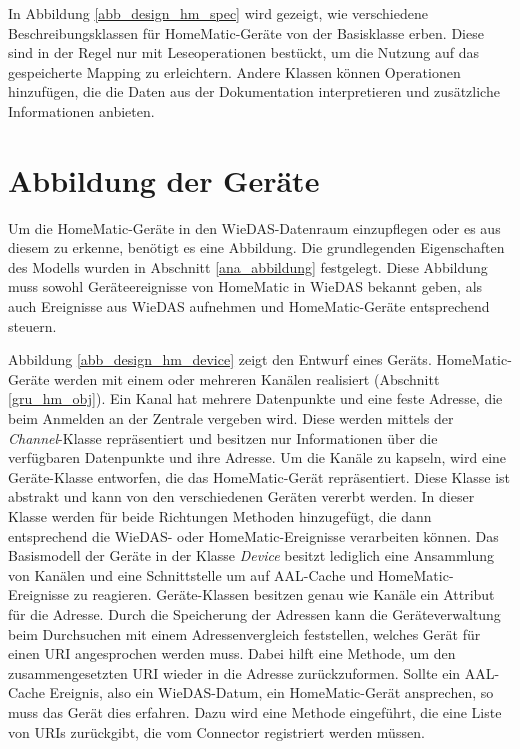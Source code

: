 \vfill
\pagebreak


In Abbildung \ref{abb_design_hm_spec} wird gezeigt, wie verschiedene Beschreibungsklassen
für HomeMatic-Geräte von der Basisklasse erben.
Diese sind in der Regel nur mit Leseoperationen bestückt, um die Nutzung auf das gespeicherte
Mapping zu erleichtern.
Andere Klassen können Operationen hinzufügen, die die Daten aus der Dokumentation \cite{homematic_xmlrpc}
interpretieren und zusätzliche Informationen anbieten.


\section{Abbildung der Geräte}
\label{des_abbildung}

Um die HomeMatic-Geräte in den WieDAS-Datenraum einzupflegen oder es aus diesem zu erkenne,
benötigt es eine Abbildung.
Die grundlegenden Eigenschaften des Modells wurden in Abschnitt \ref{ana_abbildung}
festgelegt.
Diese Abbildung muss sowohl Geräteereignisse von HomeMatic in WieDAS bekannt geben,
als auch Ereignisse aus WieDAS aufnehmen und HomeMatic-Geräte entsprechend steuern.


Abbildung \ref{abb_design_hm_device} zeigt den Entwurf eines Geräts.
HomeMatic-Geräte werden mit einem oder mehreren Kanälen realisiert (Abschnitt \ref{gru_hm_obj}).
Ein Kanal hat mehrere Datenpunkte und eine feste Adresse, die beim Anmelden an der Zentrale
vergeben wird.
Diese werden mittels der \emph{Channel}-Klasse repräsentiert und besitzen nur
Informationen über die verfügbaren Datenpunkte und ihre Adresse.
Um die Kanäle zu kapseln, wird eine Geräte-Klasse entworfen, die das HomeMatic-Gerät
repräsentiert.
Diese Klasse ist abstrakt und kann von den verschiedenen Geräten vererbt werden.
In dieser Klasse werden für beide Richtungen Methoden hinzugefügt, die dann
entsprechend die WieDAS- oder HomeMatic-Ereignisse verarbeiten können.
Das Basismodell der Geräte in der Klasse \emph{Device} besitzt lediglich eine Ansammlung
von Kanälen und eine Schnittstelle um auf AAL-Cache und HomeMatic-Ereignisse zu reagieren.
Geräte-Klassen besitzen genau wie Kanäle ein Attribut für die Adresse.
Durch die Speicherung der Adressen kann die Geräteverwaltung beim Durchsuchen mit einem
Adressenvergleich feststellen, welches Gerät für einen URI angesprochen werden muss.
Dabei hilft eine Methode, um den zusammengesetzten URI wieder in die Adresse zurückzuformen.
Sollte ein AAL-Cache Ereignis, also ein WieDAS-Datum, ein HomeMatic-Gerät ansprechen, so muss
das Gerät dies erfahren.
Dazu wird eine Methode eingeführt, die eine Liste von URIs zurückgibt, die vom Connector
registriert werden müssen.

